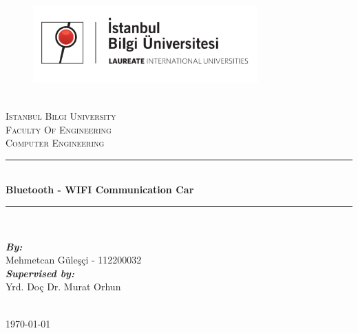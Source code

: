 \documentclass[11pt]{article}
\begin{document}
\begin{titlepage}

\newcommand{\HRule}{\rule{\linewidth}{0.5mm}} 

\begin{figure}
\includegraphics[width=0.77\textwidth]{bilgi.jpg}
\end{figure}

\center 

\textsc{\LARGE}\\[0.3cm]
\textsc{\LARGE Istanbul Bilgi University}\\[1.2cm]
\textsc{\Large Faculty Of Engineering}\\[0.5cm]
\textsc{\large Computer Engineering}\\[0.7cm] 

\HRule \\[0.8cm]
{ \huge \bfseries Bluetooth - WIFI Communication Car}\\[0.4cm] 
\HRule \\[0.8cm]
 
\begin{minipage}{0.4\textwidth}
\begin{flushleft} \large
\centering
\vspace{0.7cm}
\emph{\textbf{By:}}\\
Mehmetcan Güleşçi - 112200032 \\
\vspace{1cm}
\emph{\textbf{Supervised by:}}\\
Yrd. Doç Dr. Murat Orhun
\end{flushleft}
\end{minipage}

\begin{minipage}{0.4\textwidth}
\end{minipage}\\[2cm]

\vspace{1.75cm}
{\large \today}\\[2cm]


\vfill
\end{titlepage}

\pagebreak
\end{document}

